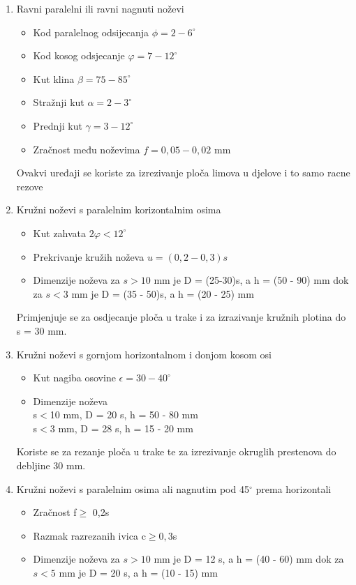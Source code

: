 \documentclass[a4paper,12pt]{article}
\numberwithin{figure}{section}
\begin{document}
\begin{enumerate}
\item Ravni paralelni ili ravni nagnuti noževi
\begin{itemize}
\item Kod paralelnog odsijecanja $\phi = 2-6^{\circ}$
\item Kod kosog odsjecanje $\varphi = 7-12^{\circ}$
\item Kut klina $\beta = 75-85^{\circ}$
\item Stražnji kut $\alpha = 2-3^{\circ}$
\item Prednji kut $\gamma = 3-12^{\circ}$
\item Zračnost među noževima $f=0,05-0,02$ mm 
\end{itemize}
Ovakvi uređaji se koriste za izrezivanje ploča limova u djelove i to samo racne rezove
\item Kružni noževi s paralelnim korizontalnim osima
\begin{itemize}
\item Kut zahvata $2\varphi<12^{\circ}$
\item Prekrivanje kružih noževa  $u = (0,2-0,3)s$
\item Dimenzije noževa za $s>10$ mm je D = (25-30)s, a h = (50 - 90) mm dok za $s<3$ mm je D = (35 - 50)s, a h = (20 - 25) mm
\end{itemize}
Primjenjuje se za osdjecanje ploča u trake i za izrazivanje kružnih plotina do s = 30 mm.
\item Kružni noževi s gornjom horizontalnom i donjom kosom osi
\begin{itemize}
\item Kut nagiba osovine $\epsilon = 30-40^{\circ}$
\item Dimenzije noževa \\
s$<$10 mm, D = 20 s, h = 50 - 80 mm\\
s$<$3 mm, D = 28 s, h = 15 - 20 mm
\end{itemize}
 Koriste se za rezanje ploča u trake te za izrezivanje okruglih prestenova do debljine 30 mm.
\item Kružni noževi s paralelnim osima ali nagnutim pod 45$^{\circ}$ prema horizontali 
\begin{itemize}
\item Zračnost f$\geqslant$ 0,2s
\item Razmak razrezanih ivica c$\geqslant 0,3$s
\item Dimenzije noževa za $s>10$ mm je D = 12 s, a h = (40 - 60) mm dok za $s<5$ mm je D = 20 s, a h = (10 - 15) mm

\end{itemize}
\end{enumerate}
\end{document}
